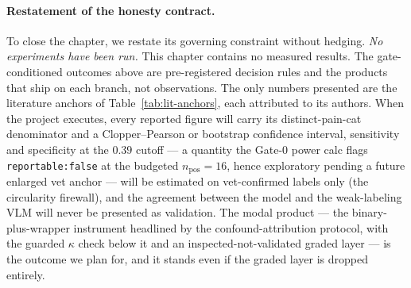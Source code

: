 \paragraph{Restatement of the honesty contract.}
To close the chapter, we restate its governing constraint without hedging.
\emph{No experiments have been run.} This chapter contains no measured results.
The gate-conditioned outcomes above are pre-registered decision rules and the
products that ship on each branch, not observations. The only numbers presented
are the literature anchors of Table~\ref{tab:lit-anchors}, each attributed to its
authors. When the project executes, every reported figure will carry its
distinct-pain-cat denominator and a Clopper--Pearson or bootstrap confidence
interval, sensitivity and specificity at the $0.39$ cutoff --- a quantity the
Gate-0 power calc flags \texttt{reportable:false} at the budgeted
$n_{\text{pos}} = 16$, hence exploratory pending a future enlarged vet anchor ---
will be estimated on vet-confirmed labels only (the circularity firewall), and the
agreement between the model and the weak-labeling VLM will never be presented as
validation. The
modal product --- the binary-plus-wrapper instrument headlined by the
confound-attribution protocol, with the guarded $\kappa$ check below it and an
inspected-not-validated graded layer --- is the outcome we plan for, and it
stands even if the graded layer is dropped entirely.
